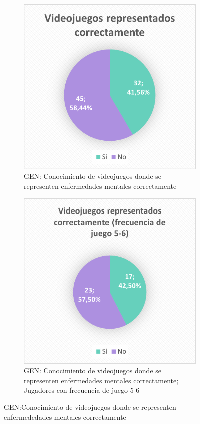 \documentclass[12pt, a4paper,twoside,titlepage]{book}
\begin{document}
\begin{figure}
\centering
\begin{subfigure}{.5\textwidth}
  \centering
  \includegraphics[width=.95\linewidth]{ANEXO Gen/17AnexGENCorr}
  \caption{GEN: Conocimiento de videojuegos donde se representen enfermedades mentales correctamente}
  
\end{subfigure}%
\begin{subfigure}{.5\textwidth}
  \centering
  \includegraphics[width=.95\linewidth]{ANEXO Gen/18AnexGENCorr56}
  \caption{GEN: Conocimiento de videojuegos donde se representen enfermedades mentales correctamente; Jugadores con frecuencia de juego 5-6}
  
\end{subfigure}
\caption{GEN:Conocimiento de videojuegos donde se representen enfermededades mentales correctamente}
\label{fig:GENCorrecto}
\end{figure}
\end{document}
